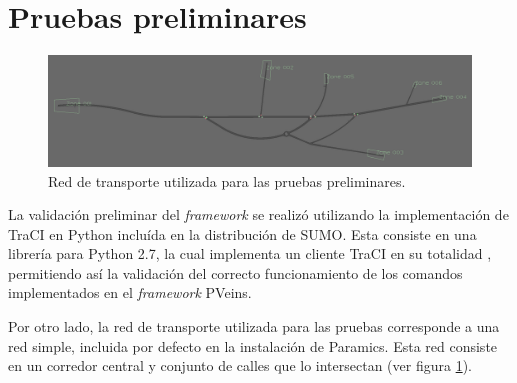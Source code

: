 \section{Pruebas preliminares}
\begin{figure}
    \centering
    \includegraphics[width=\linewidth]{figuras/network8.png}
    \caption{Red de transporte utilizada para las pruebas preliminares.}
    \label{fig:network8}
\end{figure}

La validación preliminar del \emph{framework} se realizó utilizando la implementación de TraCI en Python incluída en la distribución de SUMO. Esta consiste en una librería para Python 2.7, la cual implementa un cliente TraCI en su totalidad \autocite{pytraci, pytracisrc}, permitiendo así la validación del correcto funcionamiento de los comandos implementados en el \emph{framework} PVeins.

Por otro lado, la red de transporte utilizada para las pruebas corresponde a una red simple, incluida por defecto en la instalación de Paramics. Esta red consiste en un corredor central y conjunto de calles que lo intersectan (ver figura \ref{fig:network8}).



\begin{figure}
    \centering
    
\end{figure}